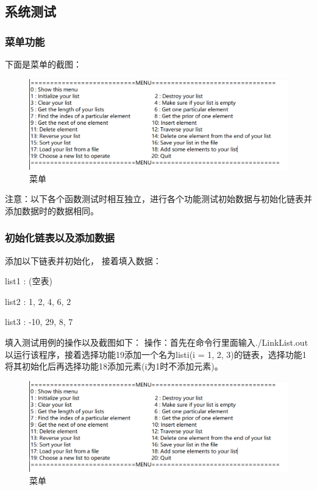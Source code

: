 \documentclass[supercite]{Experimental_Report}
\theoremstyle{definition}
\begin{document}
\subsection{系统测试}
\subsubsection{菜单功能}
下面是菜单的截图：
\begin{figure}[htbp]
	\centering
	\includegraphics[scale = 0.7]{images/1.png}
	\caption{菜单}
\end{figure}

注意：以下各个函数测试时相互独立，进行各个功能测试初始数据与初始化链表并添加数据时的数据相同。

\subsubsection{初始化链表以及添加数据}
添加以下链表并初始化， 接着填入数据：

list1 : (空表)

list2 : 1, 2, 4, 6, 2

list3 : -10, 29, 8, 7

填入测试用例的操作以及截图如下：
操作：首先在命令行里面输入./LinkList.out以运行该程序，接着选择功能19添加一个名为listi(i = 1, 2, 3)的链表，选择功能1将其初始化后再选择功能18添加元素(i为1时不添加元素)。\newpage
\begin{figure}[htbp]
	\centering
	\includegraphics[scale = 0.7]{images/1.png}
	\caption{菜单}
\end{figure}
\end{document}
